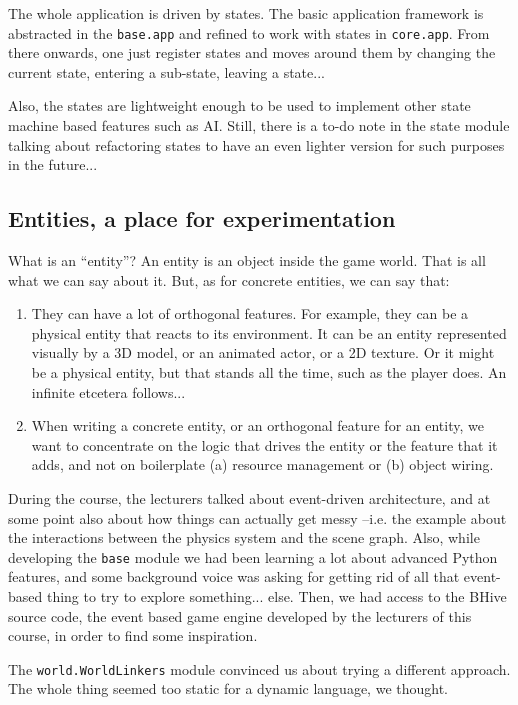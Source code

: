 \documentclass[a4paper,10pt]{article}
\begin{document}
The whole application is driven by states. The basic application
framework is abstracted in the \texttt{base.app} and refined to work
with states in \texttt{core.app}. From there onwards, one just
register states and moves around them by changing the current state,
entering a sub-state, leaving a state...

Also, the states are lightweight enough to be used to implement other
state machine based features such as AI. Still, there is a to-do note
in the state module talking about refactoring states to have an even
lighter version for such purposes in the future...


\subsection{Entities, a place for experimentation}
\label{sec:entities}
What is an ``entity''? An entity is an object inside the game
world. That is all what we can say about it. But, as for concrete
entities, we can say that:

\begin{enumerate}
\item They can have a lot of orthogonal features. For example, they
  can be a physical entity that reacts to its environment. It can be
  an entity represented visually by a 3D model, or an animated actor,
  or a 2D texture. Or it might be a physical entity, but that stands
  all the time, such as the player does. An infinite etcetera
  follows...

\item When writing a concrete entity, or an orthogonal feature for an
  entity, we want to concentrate on the logic that drives the entity
  or the feature that it adds, and not on boilerplate (a) resource
  management or (b) object wiring.
\end{enumerate}

During the course, the lecturers talked about event-driven
architecture, and at some point also about how things can actually get
messy --i.e. the example about the interactions between the physics
system and the scene graph. Also, while developing the \texttt{base}
module we had been learning a lot about advanced Python features, and
some background voice was asking for getting rid of all that
event-based thing to try to explore something... else. Then, we had
access to the BHive source code, the event based game engine developed
by the lecturers of this course, in order to find some inspiration.

The \texttt{world.WorldLinkers} module convinced us about trying a
different approach. The whole thing seemed too static for a dynamic
language, we thought.
\end{document}
